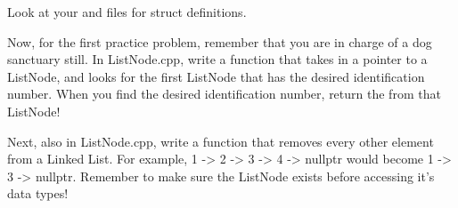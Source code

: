 \documentclass{tufte-handout}
\begin{document}
Look at your  and  files for struct definitions.

Now, for the first practice problem, remember that you are in charge of a dog sanctuary still. 
In ListNode.cpp, write a function  that takes in a pointer to a ListNode, and looks for the first ListNode that has the desired identification number.
When you find the desired identification number, return the  from that ListNode!

Next, also in ListNode.cpp, write a function that removes every other element from a Linked List.  
For example, 1 -> 2 -> 3 -> 4 -> nullptr would become 1 -> 3 -> nullptr.  
Remember to make sure the ListNode exists before accessing it's data types!
\end{document}
